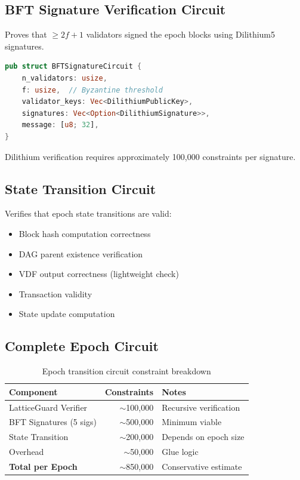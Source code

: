 \documentclass[11pt,a4paper]{article}
\begin{document}
\subsection{BFT Signature Verification Circuit}

Proves that $\geq 2f+1$ validators signed the epoch blocks using Dilithium5 signatures.

\begin{lstlisting}[language=Rust,caption=BFT signature circuit]
pub struct BFTSignatureCircuit {
    n_validators: usize,
    f: usize,  // Byzantine threshold
    validator_keys: Vec<DilithiumPublicKey>,
    signatures: Vec<Option<DilithiumSignature>>,
    message: [u8; 32],
}
\end{lstlisting}

Dilithium verification requires approximately 100,000 constraints per signature.

\subsection{State Transition Circuit}

Verifies that epoch state transitions are valid:
\begin{itemize}
    \item Block hash computation correctness
    \item DAG parent existence verification
    \item VDF output correctness (lightweight check)
    \item Transaction validity
    \item State update computation
\end{itemize}

\subsection{Complete Epoch Circuit}

\begin{table}[h]
\centering
\begin{tabular}{lrl}
\toprule
\textbf{Component} & \textbf{Constraints} & \textbf{Notes} \\
\midrule
LatticeGuard Verifier & $\sim$100,000 & Recursive verification \\
BFT Signatures (5 sigs) & $\sim$500,000 & Minimum viable \\
State Transition & $\sim$200,000 & Depends on epoch size \\
Overhead & $\sim$50,000 & Glue logic \\
\midrule
\textbf{Total per Epoch} & $\sim$850,000 & Conservative estimate \\
\bottomrule
\end{tabular}
\caption{Epoch transition circuit constraint breakdown}
\end{table}
\end{document}

